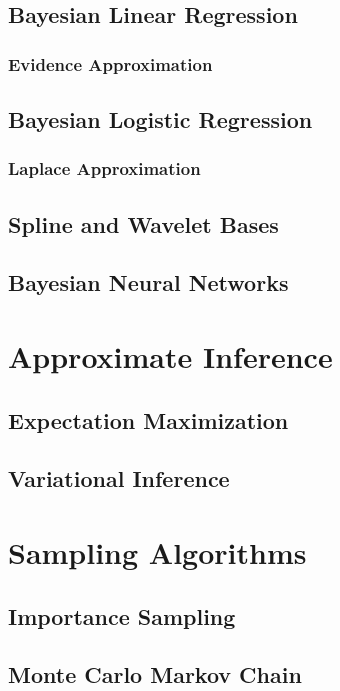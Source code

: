 \documentclass[12pt]{article}
\begin{document}
\subsection{Bayesian Linear Regression}

\subsubsection{Evidence Approximation}

\subsection{Bayesian Logistic Regression}

\subsubsection{Laplace Approximation}

\subsection{Spline and Wavelet Bases}

\subsection{Bayesian Neural Networks}
\section{Approximate Inference}

\subsection{Expectation Maximization}

\subsection{Variational Inference}

\section{Sampling Algorithms}

\subsection{Importance Sampling}

\subsection{Monte Carlo Markov Chain}
\end{document}
